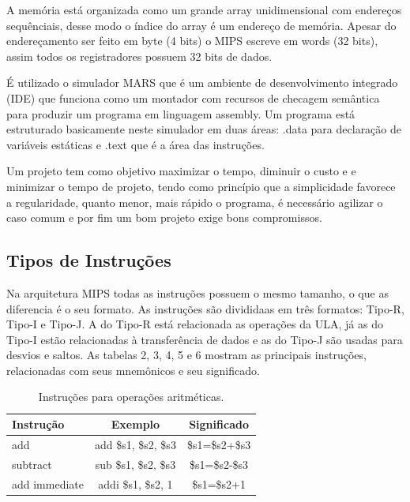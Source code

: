 \documentclass[10pt,twocolumn,letterpaper]{article}
\begin{document}
A memória está organizada como um grande array unidimensional com endereços sequênciais, desse modo o índice do array é um endereço de memória. Apesar do endereçamento ser feito em byte (4 bits) o MIPS escreve em words (32 bits), assim todos os registradores possuem 32 bits de dados.

É utilizado o simulador MARS que é um ambiente de desenvolvimento integrado (IDE) que funciona como um montador com recursos de checagem semântica para produzir um programa em linguagem assembly. Um programa está estruturado basicamente neste simulador em duas áreas: .data para declaração de variáveis estáticas e .text que é a área das instruções.

Um projeto tem como objetivo maximizar o tempo, diminuir o custo e e minimizar o tempo de projeto, tendo como princípio que a simplicidade favorece a regularidade, quanto menor, mais rápido o programa, é necessário agilizar o caso comum e por fim um bom projeto exige bons compromissos.


\subsection{Tipos de Instruções}

Na arquitetura MIPS todas as instruções possuem o mesmo tamanho, o que as diferencia é o seu formato. As instruções são divididaas em três formatos: Tipo-R, Tipo-I e Tipo-J. A do Tipo-R está relacionada as operações da ULA, já as do Tipo-I estão relacionadas à transferência de dados e as do Tipo-J são usadas para desvios e saltos. As tabelas 2, 3, 4, 5 e 6 mostram as principais instruções, relacionadas com seus mnemônicos e seu significado.

\begin{table}[h]
\renewcommand{\tablename}{Tabela}
\begin{center}
\begin{tabular}{|l|c||c|}
\hline
Instrução & Exemplo & Significado \\
\hline\hline
add & add \$s1, \$s2, \$s3 & \$s1=\$s2+\$s3\\
subtract & sub \$s1, \$s2, \$s3 & \$s1=\$s2-\$s3\\
add immediate & addi \$s1, \$s2, 1 & \$s1=\$s2+1\\
\hline
\end{tabular}
\end{center}
\caption{Instruções para operações aritméticas.}
\end{table}
\end{document}
